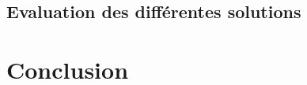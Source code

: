 \documentclass[conference]{./sty/IEEEtran}
\begin{document}
\subsection{Evaluation des différentes solutions}



\section{Conclusion}




\end{document}

